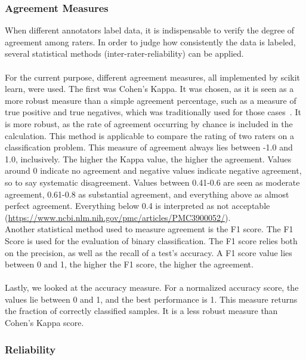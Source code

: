 \subsubsection{Agreement Measures}

When different annotators label data, it is indispensable to verify the degree of agreement among raters. In order to judge how consistently the data is labeled, several statistical methods (inter-rater-reliability) can be applied. \\
 \\
For the current purpose, different agreement measures, all implemented by scikit learn, were used. The first was Cohen’s Kappa. It was chosen, as it is seen as a more robust measure than a simple agreement percentage, such as a measure of true positive and true negatives, which was traditionally used for those cases~\citep{cohen1960coefficient}. It is more robust, as the rate of agreement occurring by chance is included in the calculation. This method is applicable to compare the rating of two raters on a classification problem. This measure of agreement always lies between -1.0 and 1.0, inclusively. The higher the Kappa value, the higher the agreement. Values around 0 indicate no agreement and negative values indicate negative agreement, so to say systematic disagreement. Values between 0.41-0.6 are seen as moderate agreement, 0.61-0.8 as substantial agreement, and everything above as almost perfect agreement. Everything below 0.4 is interpreted as not acceptable (\url{https://www.ncbi.nlm.nih.gov/pmc/articles/PMC3900052/}). \\
Another statistical method used to measure agreement is the F1 score. The F1 Score is used for the evaluation of binary classification. The F1 score relies both on the precision, as well as the recall of a test’s accuracy. A F1 score value lies between 0 and 1, the higher the F1 score, the higher the agreement. \\
\\
Lastly, we looked at the accuracy measure. For a normalized accuracy score, the values lie between 0 and 1, and the best performance is 1. This measure returns the fraction of correctly classified samples. It is a less robust measure than Cohen’s Kappa score.

\subsubsection{Reliability}


